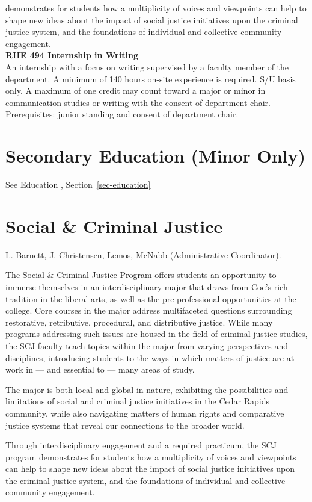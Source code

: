 \documentclass[
  letterpaper,
]{scrbook}
\begin{document}
demonstrates for students how a multiplicity of voices and viewpoints
can help to shape new ideas about the impact of social justice
initiatives upon the criminal justice system, and the foundations of
individual and collective community engagement.\\
\textbf{RHE 494 Internship in Writing}\\
An internship with a focus on writing supervised by a faculty member of
the department. A minimum of 140 hours on-site experience is required.
S/U basis only. A maximum of one credit may count toward a major or
minor in communication studies or writing with the consent of department
chair. Prerequisites: junior standing and consent of department chair.

\section{Secondary Education (Minor
Only)}\label{secondary-education-minor-only}

See Education , Section~\ref{sec-education}

\section{Social \& Criminal Justice}\label{social-criminal-justice}

L. Barnett, J. Christensen, Lemos, McNabb (Administrative Coordinator).

The Social \& Criminal Justice Program offers students an opportunity to
immerse themselves in an interdisciplinary major that draws from Coe's
rich tradition in the liberal arts, as well as the pre-professional
opportunities at the college. Core courses in the major address
multifaceted questions surrounding restorative, retributive, procedural,
and distributive justice. While many programs addressing such issues are
housed in the field of criminal justice studies, the SCJ faculty teach
topics within the major from varying perspectives and disciplines,
introducing students to the ways in which matters of justice are at work
in --- and essential to --- many areas of study.

The major is both local and global in nature, exhibiting the
possibilities and limitations of social and criminal justice initiatives
in the Cedar Rapids community, while also navigating matters of human
rights and comparative justice systems that reveal our connections to
the broader world.

Through interdisciplinary engagement and a required practicum, the SCJ
program demonstrates for students how a multiplicity of voices and
viewpoints can help to shape new ideas about the impact of social
justice initiatives upon the criminal justice system, and the
foundations of individual and collective community engagement.
\end{document}
